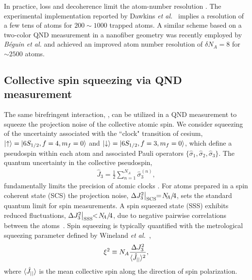 \documentclass[aps,pra,twocolumn]{revtex4-1} %
\newcommand{\scs}{{\rm SCS}}
\newcommand{\varz}{\Delta J_3^2}
\newcommand{\jz}{\hat{J}_3}
\begin{document}
{\color{blue} 
In practice, loss and decoherence %
limit the atom-number resolution %
\cite{dawkins_dispersive_2011, zhang_collective_2012}. The experimental implementation %
reported by Dawkins \emph{et al.}~\cite{dawkins_dispersive_2011} implies a resolution of a few tens of atoms for $ 200\sim 1000 $ trapped atoms.  %
A similar scheme based on a two-color QND measurement in a nanofiber geometry was recently employed by \emph{B\'{e}guin et al.} \cite{beguin_generation_2014} and achieved an improved atom number resolution of $\delta N_A = 8$ for $\sim2500$ atoms. %
}




	\subsection{Collective spin squeezing via QND measurement}

The same birefringent interaction, , can be utilized in a QND measurement to squeeze the projection noise of the collective atomic spin.  We consider squeezing of the uncertainty associated with the ``clock" transition of cesium, $\lvert{\uparrow}\rangle = \lvert{6S_{1/2}, f=4, m_f=0}\rangle$ and $\lvert{\downarrow}\rangle = \lvert{6S_{1/2}, f=3, m_f=0}\rangle$, which define a pseudospin within each atom and associated Pauli operators $\{\hat{\sigma}_1, \hat{\sigma}_2, \hat{\sigma}_3\}$.  The quantum uncertainty in the collective pseudospin,
	\begin{align}
		\jz = \frac{1}{2} \sum_{n=1}^{N_A} \hat{\sigma}_3^{(n)},  
	\end{align}
fundamentally limits the precision of atomic clocks \cite{wineland_spin_1992}. For atoms prepared in a spin coherent state (SCS) the projection noise, $\varz \big|_{\scs} \!\!=\! N\!\!_A/\!4$, sets the standard quantum limit for spin measurements. A spin squeezed state (SSS) exhibits reduced fluctuations, $ \varz \big|_{\rm SSS}  \!\!<\! N\!\!_A/\!4$, due to negative pairwise correlations between the atoms~\cite{kitagawa_squeezed_1993}. Spin squeezing is typically quantified with the metrological squeezing parameter defined by Wineland \emph{et al.}~\cite{wineland_spin_1992},
	\begin{align} \label{Eq::SqueezingParameter}
		\xi^2 \equiv N_A \frac{ \varz }{ \expt{\hat{J}_{||}}^2 },
	\end{align}
where $\langle{\hat{J}_{||}}\rangle$ is the mean collective spin along the direction of spin polarization. 
\end{document}

